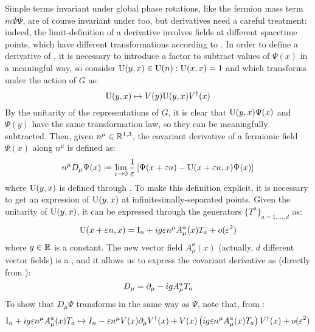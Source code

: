 Simple terms invariant under global phase rotations, like the fermion mass term $ m \bar{\Psi} \Psi $, are of course invariant under  too, but derivatives need a careful treatment: indeed, the limit-definition of a derivative involves fields at different spacetime points, which have different transformations according to . In order to define a derivative of \Psi, it is necessary to introduce a factor to subtract values of $ \Psi(x) $ in a meaningful way, so consider $ \mathrm{U}(y,x) \in \mathrm{U}(n) : \mathrm{U}(x,x) = 1 $ and which transforms under the action of $ G $ as:
\begin{equation}
  \mathrm{U}(y,x) \mapsto V(y) \mathrm{U}(y,x) V^\dagger(x)
  \label{eq:fac-cov-der}
\end{equation}
By the unitarity of the representations of $ G $, it is clear that $ \mathrm{U}(y,x) \Psi(x) $ and $ \Psi(y) $ have the same transformation law, so they can be meaningfully subtracted. Then, given $ n^\mu \in \mathbb{R}^{1,3} $, the covariant derivative of a fermionic field $ \Psi(x) $ along $ n^\mu $ is defined as:
\begin{equation}
  n^\mu D_\mu \Psi(x) \defeq \lim_{\varepsilon \rightarrow 0} \frac{1}{\varepsilon} \left[ \Psi(x + \varepsilon n) - \mt{U}(x + \varepsilon n, x) \Psi(x) \right]
  \label{eq:cov-der-def}
\end{equation}
where $ \mathrm{U}(y,x) $ is defined through . To make this definition explicit, it is necessary to get an expression of $ \mathrm{U}(y,x) $ at infinitesimally-separated points. Given the unitarity of $ \mathrm{U}(y,x) $, it can be expressed through the generators $ \{T^a\}_{a = 1, \dots, d} $ as:
\begin{equation}
  \mathrm{U}(x + \varepsilon n, x) = \mathrm{I}_n + i g \varepsilon n^\mu A_\mu^a(x) T_a + o(\varepsilon^2)
  \label{eq:fac-cov-der-exp}
\end{equation}
where $ g \in \mathbb{R} $ is a constant. The new vector field $ A_\mu^a(x) $ (actually, $ d $ different vector fields) is a , and it allows us to express the covariant derivative as (directly from ):
\begin{equation}
  D_\mu = \partial_\mu - i g A_\mu^a T_a
\end{equation}
To show that $ D_\mu \Psi $ transforms in the same way as $ \Psi $, note that, from :
\begin{equation*}
  \mathrm{I}_n + i g \varepsilon n^\mu A_\mu^a(x) T_a \mapsto I_n - \varepsilon n^\mu V(x) \partial_\mu V^\dagger(x) + V(x) \left( i g \varepsilon n^\mu A_\mu^a(x) T_a \right) V^\dagger(x) + o(\varepsilon^2)
\end{equation*}
